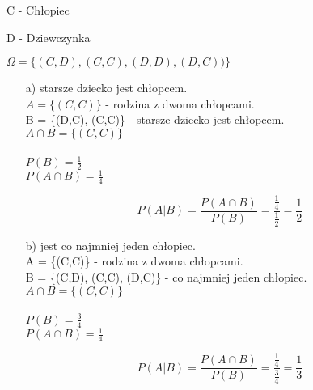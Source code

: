 \medskip
{} 
\medskip

C - Chłopiec

D - Dziewczynka

$\Omega = \{(C,D), (C,C), (D,D), (D,C))\}$


\begin{itemize}

\item[a)] starsze dziecko jest chłopcem.
\\$A = \{(C,C)\}$ - rodzina z dwoma chłopcami.
\\B = \{(D,C), (C,C)\} - starsze dziecko jest chłopcem.
\\$A \cap B = \{(C,C)\}$
\\
\\$P(B) = \frac{1}{2}$
\\$P(A \cap B) = \frac{1}{4}$

$$P(A | B) = \frac{P(A \cap B)}{P(B)} = \frac{\frac{1}{4}}{\frac{1}{2}} = \frac{1}{2}$$
\item[b)] jest co najmniej jeden chłopiec.
\\A = \{(C,C)\} - rodzina z dwoma chłopcami.
\\B = \{(C,D), (C,C), (D,C)\} - co najmniej jeden chłopiec.
\\$A \cap B = \{(C,C)\}$
\\
\\$P(B) = \frac{3}{4}$
\\$P(A \cap B) = \frac{1}{4}$

$$P(A | B) = \frac{P(A \cap B)}{P(B)} = \frac{\frac{1}{4}}{\frac{3}{4}} = \frac{1}{3}$$

\end{itemize}

